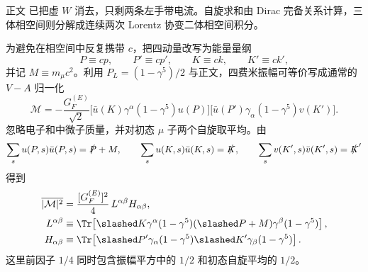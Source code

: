 \begin{derivation}[缪子衰变的自旋求和与三体相空间]
正文 已把虚 $W$ 消去，只剩两条左手带电流。自旋求和由 Dirac 完备关系计算，三体相空间则分解成连续两次 Lorentz 协变二体相空间积分。

为避免在相空间中反复携带 $c$，把四动量改写为能量量纲
\begin{equation*}
P\equiv cp,\qquad P'\equiv cp',\qquad K\equiv ck,\qquad K'\equiv ck',
\end{equation*}
并记 $M\equiv m_\mu c^2$。利用 $P_L=(1-\gamma^5)/2$ 与正文，四费米振幅可等价写成通常的 $V-A$ 归一化
\begin{equation*}
\mathcal M
=-\frac{G_F^{(E)}}{\sqrt2}
\bigl[\bar u(K)\gamma^\alpha(1-\gamma^5)u(P)\bigr]
\bigl[\bar u(P')\gamma_\alpha(1-\gamma^5)v(K')\bigr].
\end{equation*}
忽略电子和中微子质量，并对初态 $\mu$ 子两个自旋取平均。由
\[
\sum_su(P,s)\bar u(P,s)=\slashed P+M,
\qquad
\sum_su(K,s)\bar u(K,s)=\slashed K,
\qquad
\sum_sv(K',s)\bar v(K',s)=\slashed K'
\]
得到
\begin{align*}
\overline{|\mathcal M|^2}
&=\frac{[G_F^{(E)}]^2}{4}\,
L^{\alpha\beta}H_{\alpha\beta},\\
L^{\alpha\beta}
&\equiv
\Tr\!\left[
\slashed K\gamma^\alpha(1-\gamma^5)
(\slashed P+M)\gamma^\beta(1-\gamma^5)
\right],\\
H_{\alpha\beta}
&\equiv
\Tr\!\left[
\slashed P'\gamma_\alpha(1-\gamma^5)
\slashed K'\gamma_\beta(1-\gamma^5)
\right].
\end{align*}
这里前因子 $1/4$ 同时包含振幅平方中的 $1/2$ 和初态自旋平均的 $1/2$。


\end{derivation}
